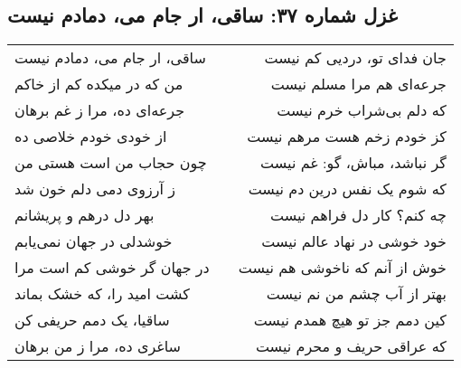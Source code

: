 \begin{center}
\section*{غزل شماره ۳۷: ساقی، ار جام می، دمادم نیست}
\label{sec:037}
\begin{longtable}{l p{0.5cm} r}
ساقی، ار جام می، دمادم نیست
&&
جان فدای تو، دردیی کم نیست
\\
من که در میکده کم از خاکم
&&
جرعه‌ای هم مرا مسلم نیست
\\
جرعه‌ای ده، مرا ز غم برهان
&&
که دلم بی‌شراب خرم نیست
\\
از خودی خودم خلاصی ده
&&
کز خودم زخم هست مرهم نیست
\\
چون حجاب من است هستی من
&&
گر نباشد، مباش، گو: غم نیست
\\
ز آرزوی دمی دلم خون شد
&&
که شوم یک نفس درین دم نیست
\\
بهر دل درهم و پریشانم
&&
چه کنم؟ کار دل فراهم نیست
\\
خوشدلی در جهان نمی‌یابم
&&
خود خوشی در نهاد عالم نیست
\\
در جهان گر خوشی کم است مرا
&&
خوش از آنم که ناخوشی هم نیست
\\
کشت امید را، که خشک بماند
&&
بهتر از آب چشم من نم نیست
\\
ساقیا، یک دمم حریفی کن
&&
کین دمم جز تو هیچ همدم نیست
\\
ساغری ده، مرا ز من برهان
&&
که عراقی حریف و محرم نیست
\\
\end{longtable}
\end{center}
